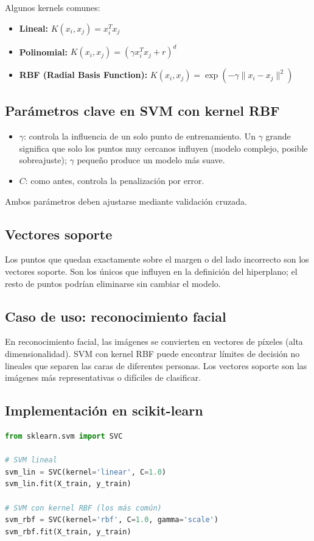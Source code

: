 \documentclass[12pt,a4paper,openany,oneside]{book}
\begin{document}
Algunos kernels comunes:
\begin{itemize}
    \item \textbf{Lineal:} \(K(x_i, x_j) = x_i^T x_j\)
    \item \textbf{Polinomial:} \(K(x_i, x_j) = (\gamma x_i^T x_j + r)^d\)
    \item \textbf{RBF (Radial Basis Function):} \(K(x_i, x_j) = \exp(-\gamma \|x_i - x_j\|^2)\)
\end{itemize}

\subsection{Parámetros clave en SVM con kernel RBF}
\begin{itemize}
    \item \(\gamma\): controla la influencia de un solo punto de entrenamiento. Un \(\gamma\) grande significa que solo los puntos muy cercanos influyen (modelo complejo, posible sobreajuste); \(\gamma\) pequeño produce un modelo más suave.
    \item \(C\): como antes, controla la penalización por error.
\end{itemize}
Ambos parámetros deben ajustarse mediante validación cruzada.

\subsection{Vectores soporte}
Los puntos que quedan exactamente sobre el margen o del lado incorrecto son los vectores soporte. Son los únicos que influyen en la definición del hiperplano; el resto de puntos podrían eliminarse sin cambiar el modelo.

\subsection{Caso de uso: reconocimiento facial}
En reconocimiento facial, las imágenes se convierten en vectores de píxeles (alta dimensionalidad). SVM con kernel RBF puede encontrar límites de decisión no lineales que separen las caras de diferentes personas. Los vectores soporte son las imágenes más representativas o difíciles de clasificar.

\subsection{Implementación en scikit-learn}
\begin{lstlisting}[language=Python]
from sklearn.svm import SVC

# SVM lineal
svm_lin = SVC(kernel='linear', C=1.0)
svm_lin.fit(X_train, y_train)

# SVM con kernel RBF (los más común)
svm_rbf = SVC(kernel='rbf', C=1.0, gamma='scale')
svm_rbf.fit(X_train, y_train)
\end{lstlisting}
\end{document}
